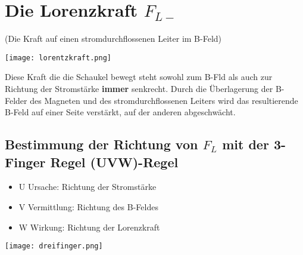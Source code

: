 \documentclass{article}
\begin{document}
\section*{Die Lorenzkraft $F_{L-}$}

(Die Kraft auf einen stromdurchflossenen Leiter im B-Feld)

\texttt{[image: lorentzkraft.png]}

Diese Kraft die die Schaukel bewegt steht sowohl zum B-Fld als auch zur Richtung der Stromstärke \textbf{immer} senkrecht.
\newline
Durch die Überlagerung der B-Felder des Magneten und des stromdurchflossenen Leiters wird das resultierende B-Feld auf einer Seite verstärkt, auf der anderen abgeschwächt.

\subsection{Bestimmung der Richtung von $F_L$ mit der 3-Finger Regel (UVW)-Regel}

\begin{itemize}
\item U Ursache: Richtung der Stromstärke
\item V Vermittlung: Richtung des B-Feldes
\item W Wirkung: Richtung der Lorenzkraft
\end{itemize}

\texttt{[image: dreifinger.png]}
\end{document}
